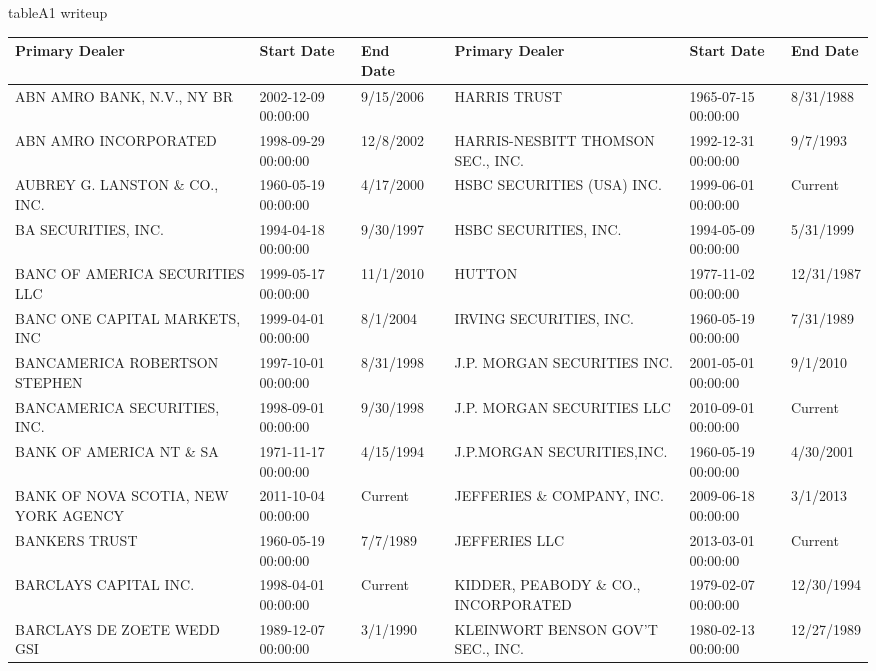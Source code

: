 \documentclass{article}
\begin{document}
\par
tableA1 writeup
\par

\begin{tabular}{lllllll}
\toprule
Primary Dealer & Start Date & End Date &  & Primary Dealer & Start Date & End Date \\
\midrule
ABN AMRO BANK, N.V., NY BR           & 2002-12-09 00:00:00 & 9/15/2006 &  & HARRIS TRUST                        & 1965-07-15 00:00:00 & 8/31/1988 \\
ABN AMRO INCORPORATED                & 1998-09-29 00:00:00 & 12/8/2002 &  & HARRIS-NESBITT THOMSON SEC., INC.   & 1992-12-31 00:00:00 & 9/7/1993 \\
AUBREY G. LANSTON \& CO., INC.       & 1960-05-19 00:00:00 & 4/17/2000 &  & HSBC SECURITIES (USA) INC.           & 1999-06-01 00:00:00 & Current \\
BA SECURITIES, INC.                 & 1994-04-18 00:00:00 & 9/30/1997 &  & HSBC SECURITIES, INC.                & 1994-05-09 00:00:00 & 5/31/1999 \\
BANC OF AMERICA SECURITIES LLC            & 1999-05-17 00:00:00 & 11/1/2010 &  & HUTTON                               & 1977-11-02 00:00:00 & 12/31/1987 \\
BANC ONE CAPITAL MARKETS, INC       & 1999-04-01 00:00:00 & 8/1/2004 &  & IRVING SECURITIES, INC.              & 1960-05-19 00:00:00 & 7/31/1989 \\
BANCAMERICA ROBERTSON STEPHEN       & 1997-10-01 00:00:00 & 8/31/1998 &  & J.P. MORGAN SECURITIES INC.         & 2001-05-01 00:00:00 & 9/1/2010 \\
BANCAMERICA SECURITIES, INC.        & 1998-09-01 00:00:00 & 9/30/1998 &  & J.P. MORGAN SECURITIES LLC & 2010-09-01 00:00:00 & Current \\
BANK OF AMERICA NT \& SA             & 1971-11-17 00:00:00 & 4/15/1994 &  & J.P.MORGAN SECURITIES,INC.           & 1960-05-19 00:00:00 & 4/30/2001 \\
BANK OF NOVA SCOTIA, NEW YORK AGENCY & 2011-10-04 00:00:00 & Current &  & JEFFERIES \& COMPANY, INC. & 2009-06-18 00:00:00 & 3/1/2013 \\
BANKERS TRUST                        & 1960-05-19 00:00:00 & 7/7/1989 &  & JEFFERIES LLC & 2013-03-01 00:00:00 & Current \\
BARCLAYS CAPITAL INC.                & 1998-04-01 00:00:00 & Current &  & KIDDER, PEABODY \& CO., INCORPORATED & 1979-02-07 00:00:00 & 12/30/1994 \\
BARCLAYS DE ZOETE WEDD GSI           & 1989-12-07 00:00:00 & 3/1/1990 &  & KLEINWORT BENSON  GOV'T SEC., INC.   & 1980-02-13 00:00:00 & 12/27/1989 \\

\end{tabular}
\end{document}
